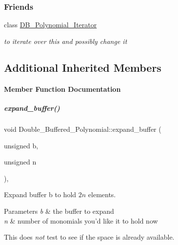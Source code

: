 \subsubsection*{Friends}
\begin{DoxyCompactItemize}
\item 
\mbox{\label{group__polygroup_aea7290ecfb1e468c20192be43af46a96}} 
class \hyperlink{group__polygroup_aea7290ecfb1e468c20192be43af46a96}{D\+B\+\_\+\+Polynomial\+\_\+\+Iterator}
\begin{DoxyCompactList}\small\item\em to iterate over {\ttfamily this} and possibly change it \end{DoxyCompactList}\end{DoxyCompactItemize}
\subsection*{Additional Inherited Members}


\paragraph{Member Function Documentation}
\mbox{\label{group__polygroup_acd9235d4fe5a56a3a0842a80b4efbdbb}} 
\subparagraph{\texorpdfstring{expand\+\_\+buffer()}{expand\_buffer()}}
{\footnotesize\ttfamily void Double\+\_\+\+Buffered\+\_\+\+Polynomial\+::expand\+\_\+buffer (\begin{DoxyParamCaption}\item[{unsigned}]{b,  }\item[{unsigned}]{n }\end{DoxyParamCaption})\hspace{0.3cm}{\ttfamily [inline]}, {\ttfamily [protected]}}



Expand buffer {\ttfamily b} to hold $ 2n $ elements. 


\begin{DoxyParams}{Parameters}
{\em b} & the buffer to expand \\
\hline
{\em n} & number of monomials you'd like it to hold now\\
\hline
\end{DoxyParams}
This does {\itshape not} test to see if the space is already available. 

